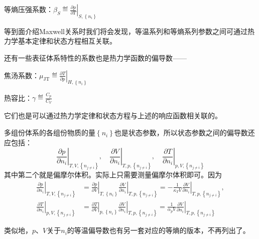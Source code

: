 \documentclass[main.tex]{subfiles}
\begin{document}
等熵压强系数：$\beta_S\eqdef\left.\frac{\partial p}{\partial T}\right|_{S,\left\{n_i\right\}}$

等到面介绍Maxwell关系时我们将会发现，等温系列和等熵系列参数之间可通过热力学基本定律和状态方程相互关联。

还有一些表征体系特性的系数也是热力学函数的偏导数——

焦汤系数：$\mu_\text{JT}\eqdef\left.\frac{\partial T}{\partial p}\right|_{H,\left\{n_i\right\}}$

热容比：$\gamma\eqdef\frac{C_p}{C_V}$

它们也是可以通过热力学定律和状态方程与上述的响应函数相关联的。

多组份体系的各组份物质的量$\left\{n_i\right\}$也是状态参数，所以状态参数之间的偏导数还应包括：
\[\left.\frac{\partial p}{\partial n_i}\right|_{T,V,\left\{n_{j\neq i}\right\}},\quad\left.\frac{\partial V}{\partial n_i}\right|_{T,p,\left\{n_{j\neq i}\right\}},\quad\left.\frac{\partial T}{\partial n_i}\right|_{p,V,\left\{n_{j\neq i}\right\}}\]
其中第二个就是偏摩尔体积。实际上只需要测量偏摩尔体积即可。因为
\begin{align*}
    \left.\frac{\partial p}{\partial n_i}\right|_{T,V,\left\{n_{j\neq i}\right\}} & =\left.\frac{\partial p}{\partial V}\right|_{T,\left\{n_i\right\}}\left.\frac{\partial V}{\partial n_i}\right|_{T,p,\left\{n_{j\neq i}\right\}}=-\frac{1}{\kappa_TV}\left.\frac{\partial V}{\partial n_i}\right|_{T,p,\left\{n_{j\neq i}\right\}}, \\
    \left.\frac{\partial T}{\partial n_i}\right|_{p,V,\left\{n_{j\neq i}\right\}} & =\left.\frac{\partial T}{\partial V}\right|_{p,\left\{n_i\right\}}\left.\frac{\partial V}{\partial n_i}\right|_{T,p,\left\{n_{j\neq i}\right\}}=\frac{1}{\alpha_p V}\left.\frac{\partial V}{\partial n_i}\right|_{T,p,\left\{n_{j\neq i}\right\}}
\end{align*}

类似地，$p$、$V$关于$n_i$的等温偏导数也有另一套对应的等熵的版本，不再列出了。
\end{document}
